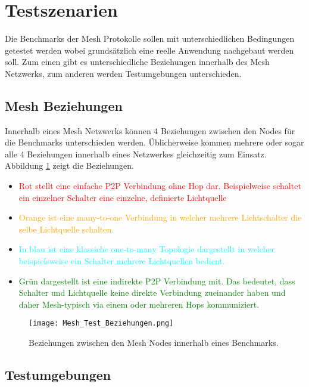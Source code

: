 	\clearpage
\section{Testszenarien}\label{sec:Testszenarien}

Die Benchmarks der Mesh Protokolle sollen mit unterschiedlichen Bedingungen getestet werden wobei grundsätzlich eine reelle Anwendung nachgebaut werden soll. Zum einen gibt es unterschiedliche Beziehungen innerhalb des Mesh Netzwerks, zum anderen werden Testumgebungen unterschieden.

\subsection{Mesh Beziehungen}\label{subsec:MeshBeziehungen}

Innerhalb eines Mesh Netzwerks können 4 Beziehungen zwischen den Nodes für die Benchmarks unterschieden werden. Üblicherweise kommen mehrere oder sogar alle 4 Beziehungen innerhalb eines Netzwerkes gleichzeitig zum Einsatz. Abbildung \ref{fig:MeshTestBeziehungen} zeigt die Beziehungen.

\begin{itemize}
 	\item \textcolor{red}{Rot stellt eine einfache P2P Verbindung ohne Hop dar. Beispielweise schaltet ein einzelner Schalter eine einzelne, definierte Lichtquelle}
 	\item \textcolor{orange}{Orange ist eine many-to-one Verbindung in welcher mehrere Lichtschalter die selbe Lichtquelle schalten.}
 	\item \textcolor{cyan}{In blau ist eine klassiche one-to-many Topologie dargestellt in welcher beispielsweise ein Schalter mehrere Lichtquellen bedient.}
 	 \item \textcolor{green}{Grün dargestellt ist eine indirekte P2P Verbindung mit. Das bedeutet, dass Schalter und Lichtquelle keine direkte Verbindung zueinander haben und daher Mesh-typisch via einem oder mehreren Hops kommuniziert.}
\end{itemize}



\begin{figure}[H]
	\centering
	\texttt{[image: Mesh\_Test\_Beziehungen.png]}
	\caption{Beziehungen zwischen den Mesh Nodes innerhalb eines Benchmarks.}\label{fig:MeshTestBeziehungen}
\end{figure}


\subsection{Testumgebungen}\label{subsec:Testumgebungen}

